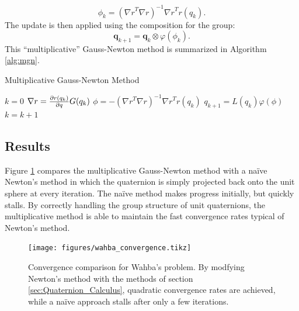 \documentclass[letterpaper, 10 pt, conference]{ieeeconf}  %
\newcommand{\q}{\textbf{q}}
\begin{document}
    \begin{equation}
    	\phi_k = ({\nabla r}^T {\nabla r})^{-1} {\nabla r}^T r(q_k).
    \end{equation}
	The update is then applied using the composition for the group:
	\begin{equation}
		\q_{k+1} = \q_k \otimes \varphi(\phi_k).
	\end{equation}
	This ``multiplicative'' Gauss-Newton method is summarized in Algorithm \ref{alg:mgn}.

    \begin{algorithm} 
    	\begin{algorithmic}[1]
    		\caption{Multiplicative Gauss-Newton Method}\label{alg:mgn}
    		\State $k = 0$
    		    \State ${\nabla r} = \pdv{r(q_k)}{q} G(q_k)$ 
    		    \State $ \phi = -({\nabla r}^T {\nabla r})^{-1} {\nabla r}^T r(q_k)$ 
    		    \State $q_{k+1} = L(q_k) \varphi(\phi)$ 
    		    \State $k = k + 1$
    		\EndWhile
    	\end{algorithmic}
    \end{algorithm}



    \subsection{Results}
    Figure \ref{fig:wahba_convergence} compares the multiplicative Gauss-Newton method
    with a na\"ive Newton's method in which the quaternion is simply projected back onto
    the unit sphere at every iteration. The na\"ive method makes progress initially, but
    quickly stalls. By correctly handling the group structure of unit quaternions, the
    multiplicative method is able to maintain the fast convergence rates typical of
    Newton's method.
    \begin{figure}

        \centering
        \texttt{[image: figures/wahba\_convergence.tikz]}
        \caption{Convergence comparison for Wahba's problem. By modfying Newton's method
        with the methods of section \ref{sec:Quaternion_Calculus}, quadratic convergence
        rates are achieved, while a na\"ive approach stalls after only a few
        iterations.}
        \label{fig:wahba_convergence}
    \end{figure}
\end{document}
